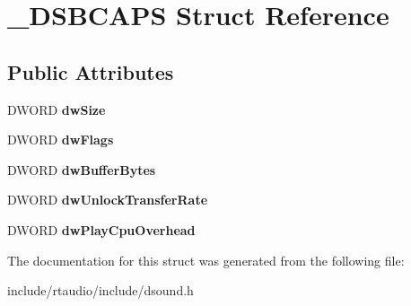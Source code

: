 \hypertarget{struct___d_s_b_c_a_p_s}{}\section{\+\_\+\+D\+S\+B\+C\+A\+PS Struct Reference}
\label{struct___d_s_b_c_a_p_s}
\subsection*{Public Attributes}
\begin{DoxyCompactItemize}
\item 
D\+W\+O\+RD {\bfseries dw\+Size}\hypertarget{struct___d_s_b_c_a_p_s_af66219aaeaa8ed8848b0a386d11dc8a4}{}\label{struct___d_s_b_c_a_p_s_af66219aaeaa8ed8848b0a386d11dc8a4}

\item 
D\+W\+O\+RD {\bfseries dw\+Flags}\hypertarget{struct___d_s_b_c_a_p_s_abf22aa93ff6d9d3ec398f1ed08d0df34}{}\label{struct___d_s_b_c_a_p_s_abf22aa93ff6d9d3ec398f1ed08d0df34}

\item 
D\+W\+O\+RD {\bfseries dw\+Buffer\+Bytes}\hypertarget{struct___d_s_b_c_a_p_s_a8d4f89242bffa5876cde94d24f997c7e}{}\label{struct___d_s_b_c_a_p_s_a8d4f89242bffa5876cde94d24f997c7e}

\item 
D\+W\+O\+RD {\bfseries dw\+Unlock\+Transfer\+Rate}\hypertarget{struct___d_s_b_c_a_p_s_a0be7befbb74d2377d90fa18644ffcf71}{}\label{struct___d_s_b_c_a_p_s_a0be7befbb74d2377d90fa18644ffcf71}

\item 
D\+W\+O\+RD {\bfseries dw\+Play\+Cpu\+Overhead}\hypertarget{struct___d_s_b_c_a_p_s_a21ba1c00e6d925f55b042f10a1ca9e55}{}\label{struct___d_s_b_c_a_p_s_a21ba1c00e6d925f55b042f10a1ca9e55}

\end{DoxyCompactItemize}


The documentation for this struct was generated from the following file\+:\begin{DoxyCompactItemize}
\item 
include/rtaudio/include/dsound.\+h\end{DoxyCompactItemize}
